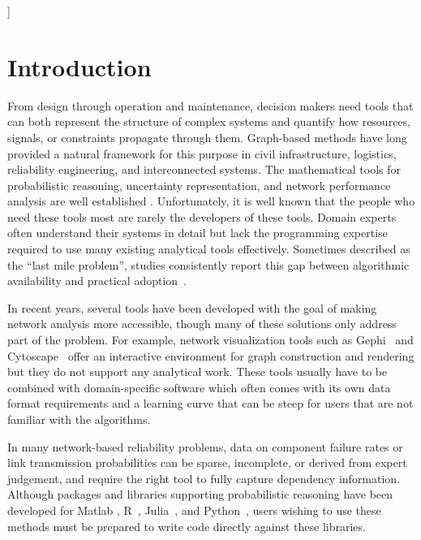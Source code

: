 \documentclass[twocolumn]{rps-esrel2026}
\begin{document}

]

\section{Introduction}
From design through operation and maintenance, decision makers need tools that can both represent the structure of complex systems and quantify how resources, signals, or constraints propagate through them. Graph-based methods have long provided a natural framework for this purpose in civil infrastructure, logistics, reliability engineering, and interconnected systems. The mathematical tools for probabilistic reasoning, uncertainty representation, and network performance analysis are well established \cite{pearl1988probabilistic,koller2009probabilistic,ferson2013}. 
Unfortunately, it is well known that the people who need these tools most are rarely the developers of these tools. 
Domain experts often understand their systems in detail but lack the programming expertise required to use many existing analytical tools effectively. Sometimes described as the ``last mile problem'', studies consistently report this gap between algorithmic availability and practical adoption~\cite{hannay2009scientists, prabhu2011survey}.

In recent years, several tools have been developed with the goal of making network analysis more accessible, though many of these solutions only address part of the problem. For example, network visualization tools such as Gephi~\cite{bastian2009gephi} and Cytoscape~\cite{shannon2003cytoscape} offer an interactive environment for graph construction and rendering but they do not support any analytical work. These tools usually have to be combined with domain-specific software which often comes with its own data format requirements and a learning curve that can be steep for users that are not familiar with the algorithms.

In many network-based reliability problems, data on component failure rates or link transmission probabilities can be sparse, incomplete, or derived from expert judgement, and require the right tool to fully capture dependency information. Although packages and libraries supporting probabilistic reasoning have been developed for Matlab \cite{OpenCossan}, R~\cite{ferson2019pbar}, Julia~\cite{gray2022pba_julia}, and Python~\cite{gray2022pba}, users wishing to use these methods must be prepared to write code directly against these libraries.
\end{document}
